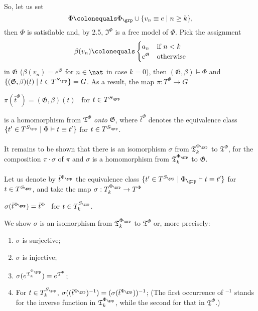 \begin{enumerate}[1.]
\ \\
So, let us set
\[
\Phi \colonequals \Phi_\grp \cup \{ v_n \equiv e \mid n \geq k \},
\]
then $\Phi$ is satisfiable and, by 2.5, $\mathfrak{I}^\Phi$ is a free model of $\Phi$. Pick the assignment
\[
\beta (v_n) \colonequals \begin{cases}
a_n & \mbox{if \(n < k\)} \cr
e^\mathfrak{G} & \mbox{otherwise}
\end{cases}
\]
in $\mathfrak{G}$ ($\beta (v_n) = e^\mathfrak{G}$ for $n \in \nat$ in case $k = 0$), then $(\mathfrak{G}, \beta) \models \Phi$ and $\{ (\mathfrak{G}, \beta)(t) \mid t \in T^{S_\grp} \} = G$. As a result, the map $\pi : T^\Phi \to G$
\begin{center}
$\pi (\bar{t}^\Phi ) = (\mathfrak{G}, \beta )(t)$ \ for $t \in T^{S_\grp}$
\end{center}
is a homomorphism from $\mathfrak{T}^\Phi$ \emph{onto} $\mathfrak{G}$, where $\bar{t}^\Phi$ denotes the equivalence class $\{ t^\prime \in T^{S_\grp} \mid \Phi \vdash t \equiv t^\prime \}$ for $t \in T^{S_\grp}$.\\
\ \\
It remains to be shown that there is an isomorphism $\sigma$ from $\mathfrak{T}_k^{\Phi_\grp}$ to $\mathfrak{T}^\Phi$, for the composition $\pi \cdot \sigma$ of $\pi$ and $\sigma$ is a homomorphism from $\mathfrak{T}_k^{\Phi_\grp}$ to $\mathfrak{G}$.\\
\ \\
Let us denote by $\bar{t}^{\Phi_\grp}$ the equivalence class $\{ t^\prime \in T^{S_\grp} \mid \Phi_\grp \vdash t \equiv t^\prime \}$ for $t \in T^{S_\grp}$, and take the map $\sigma : T_k^{\Phi_\grp} \to T^\Phi$
\begin{center}
$\sigma (\bar{t}^{\Phi_\grp}) = \bar{t}^\Phi$ \ for $t \in T_k^{S_\grp}$.
\end{center}
We show $\sigma$ is an isomorphism from $\mathfrak{T}_k^{\Phi_\grp}$ to $\mathfrak{T}^\Phi$ or, more precisely:
\begin{enumerate}[(1)]
\item $\sigma$ is surjective;
\item $\sigma$ is injective;
\item $\sigma (e^{\mathfrak{T}_k^{\Phi_\grp}}) = e^{\mathfrak{T}^\Phi}$;
\item For $t \in T_k^{S_\grp}$, $\sigma ((\bar{t}^{\Phi_\grp})^{-1}) = (\sigma (\bar{t}^{\Phi_\grp}))^{-1}$; (The first occurrence of $^{-1}$ stands for the inverse function in $\mathfrak{T}_k^{\Phi_\grp}$, while the second for that in $\mathfrak{T}^\Phi$.)

\end{enumerate}
\end{enumerate}
